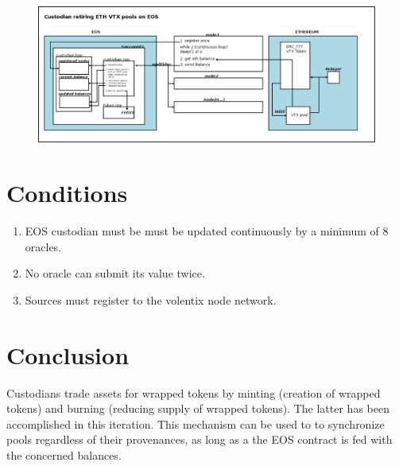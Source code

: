 \documentclass[]{article}
\begin{document}
 
 
\begin{figure}
\centering
	\includegraphics[scale=.33333]{bridge.png}
\caption{}
\label{fig:whitebackground-ecosystem02}
\end{figure}

\section{Conditions}
\begin{enumerate}
	\item EOS custodian must be  must be updated continuously by a minimum of 8 oracles.
	\item No oracle can submit its value twice. 
	\item Sources must register to the volentix node network.
	
\end{enumerate}



\section{Conclusion}
Custodians trade assets for wrapped tokens by minting (creation of wrapped tokens) and burning (reducing supply of wrapped tokens). The latter has been accomplished in this iteration.
This mechanism can be used to to synchronize pools regardless of their provenances, as long as a the EOS contract is fed with the concerned balances.
\end{document}
